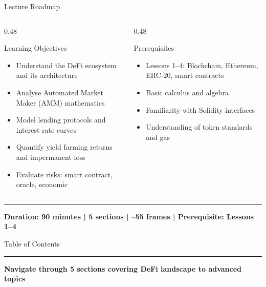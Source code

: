 \documentclass[8pt,aspectratio=169]{beamer}
\newcommand{\bottomnote}[1]{\vfill\vspace{-2mm}\textcolor{mllavender2}{\rule{\textwidth}{0.4pt}}\vspace{1mm}\footnotesize\textbf{#1}}
\begin{document}
\begin{frame}{Lecture Roadmap}
  \vspace{4mm}
  \begin{columns}[T]
    \begin{column}{0.48\textwidth}
      \begin{block}{Learning Objectives}
        \begin{itemize}\setlength\itemsep{1pt}
          \item Understand the DeFi ecosystem and its architecture
          \item Analyse Automated Market Maker (AMM) mathematics
          \item Model lending protocols and interest rate curves
          \item Quantify yield farming returns and impermanent loss
          \item Evaluate risks: smart contract, oracle, economic
        \end{itemize}
      \end{block}
    \end{column}
    \begin{column}{0.48\textwidth}
      \begin{block}{Prerequisites}
        \begin{itemize}\setlength\itemsep{1pt}
          \item Lessons 1--4: Blockchain, Ethereum, ERC-20, smart contracts
          \item Basic calculus and algebra
          \item Familiarity with Solidity interfaces
          \item Understanding of token standards and gas
        \end{itemize}
      \end{block}
    \end{column}
  \end{columns}
  \bottomnote{Duration: 90 minutes | 5 sections | \textasciitilde55 frames | Prerequisite: Lessons 1--4}
\end{frame}

\begin{frame}{Table of Contents}
  \tableofcontents
  \bottomnote{Navigate through 5 sections covering DeFi landscape to advanced topics}
\end{frame}
\end{document}
